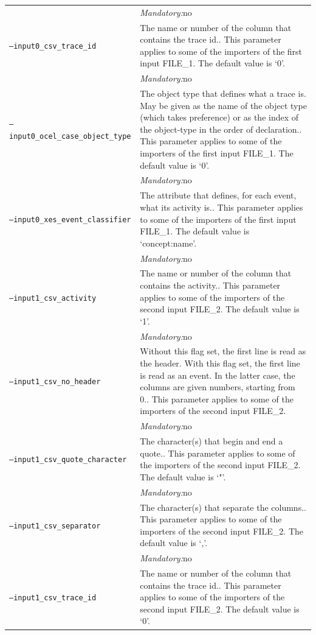 {\begin{tabularx}{\linewidth}{lX}
&\textit{Mandatory:}\quad no\\
\texttt{--input0\_csv\_trace\_id} & The name or number of the column that contains the trace id.. This parameter applies to some of the importers of the first input FILE\_1. The default value is `0'.\\
&\textit{Mandatory:}\quad no\\
\texttt{--input0\_ocel\_case\_object\_type} & The object type that defines what a trace is. May be given as the name of the object type (which takes preference) or as the index of the object-type in the order of declaration.. This parameter applies to some of the importers of the first input FILE\_1. The default value is `0'.\\
&\textit{Mandatory:}\quad no\\
\texttt{--input0\_xes\_event\_classifier} & The attribute that defines, for each event, what its activity is.. This parameter applies to some of the importers of the first input FILE\_1. The default value is `concept:name'.\\
&\textit{Mandatory:}\quad no\\
\texttt{--input1\_csv\_activity} & The name or number of the column that contains the activity.. This parameter applies to some of the importers of the second input FILE\_2. The default value is `1'.\\
&\textit{Mandatory:}\quad no\\
\texttt{--input1\_csv\_no\_header} & Without this flag set, the first line is read as the header. 
    With this flag set, the first line is read as an event. In the latter case, the columns are given numbers, starting from 0.. This parameter applies to some of the importers of the second input FILE\_2. \\
&\textit{Mandatory:}\quad no\\
\texttt{--input1\_csv\_quote\_character} & The character(s) that begin and end a quote.. This parameter applies to some of the importers of the second input FILE\_2. The default value is `"'.\\
&\textit{Mandatory:}\quad no\\
\texttt{--input1\_csv\_separator} & The character(s) that separate the columns.. This parameter applies to some of the importers of the second input FILE\_2. The default value is `,'.\\
&\textit{Mandatory:}\quad no\\
\texttt{--input1\_csv\_trace\_id} & The name or number of the column that contains the trace id.. This parameter applies to some of the importers of the second input FILE\_2. The default value is `0'.\\

\end{tabularx}}
